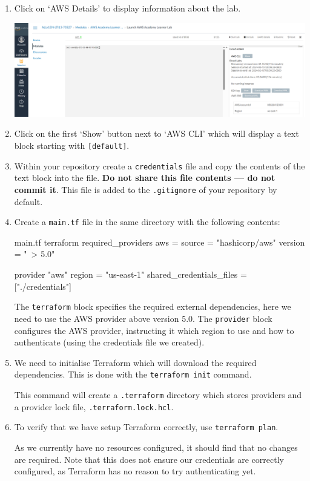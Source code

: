 \documentclass{csse4400}
\begin{document}
\begin{enumerate}
\item Click on `AWS Details' to display information about the lab.

\hspace{-4mm}
\includegraphics[width=\textwidth]{images/aws-details}

\item Click on the first `Show' button next to `AWS CLI' which will display a text block starting with \texttt{[default]}.
\item Within your repository create a \texttt{credentials} file and copy the contents of the text block into the file.
\textbf{Do not share this file contents --- do not commit it}.
This file is added to the \texttt{.gitignore} of your repository by default.
\item Create a \texttt{main.tf} file in the same directory with the following contents:
\begin{code}[language=terraform,numbers=none]{main.tf}
terraform {
    required_providers {
        aws = {
            source  = "hashicorp/aws"
            version = "~> 5.0"
        }
    }
}

provider "aws" {
    region = "us-east-1"
    shared_credentials_files = ["./credentials"]
}
\end{code}

The \texttt{terraform} block specifies the required external dependencies, here we need to use the AWS provider above version 5.0.
The \texttt{provider} block configures the AWS provider, instructing it which region to use and how to authenticate (using the credentials file we created).

\item We need to initialise Terraform which will download the required dependencies.
    This is done with the \texttt{terraform init} command.

This command will create a \texttt{.terraform} directory which stores providers and a provider lock file, \texttt{.terraform.lock.hcl}.

\item To verify that we have setup Terraform correctly, use \texttt{terraform plan}.

As we currently have no resources configured, it should find that no changes are required.
Note that this does not ensure our credentials are correctly configured, as Terraform has no reason to try authenticating yet.

\end{enumerate}
\end{document}

